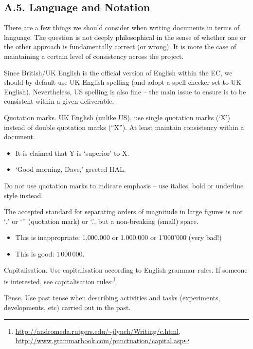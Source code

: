 \subsection*{A.5. Language and Notation}
\label{sec:appendix-a5-language-notation}

There are a few things we should consider when writing documents in terms of language. The question is not deeply philosophical in the sense of whether one or the other approach is fundamentally correct (or wrong). It is more the case of maintaining a certain level of consistency across the project.

Since British/UK English is the official version of English within the EC, we should by default use UK English spelling (and adopt a spell-checker set to UK English). Nevertheless, US spelling is also fine – the main issue to ensure is to be consistent within a given deliverable.

Quotation marks. UK English (unlike US), use single quotation marks (‘X’) instead of double quotation marks (``X''). At least maintain consistency within a document. 

\begin{itemize}
	\item It is claimed that Y is ‘superior’ to X. 
	\item ‘Good morning, Dave,’ greeted HAL.
\end{itemize}

Do not use quotation marks to indicate emphasis – use italics, bold or underline style instead.

The accepted standard for separating orders of magnitude in large figures is not ‘,’ or ‘’’ (quotation mark) or ‘.’, but a non-breaking (small) space. 

\begin{itemize}
	\item This is inappropriate: 1,000,000 or 1.000.000 or 1’000’000 (very bad!) 
	\item This is good: $1\,000\,000$. 
\end{itemize}

Capitalisation. Use capitalisation according to English grammar rules. If someone is interested, see 
capitalisation rules:\footnote{\url{http://andromeda.rutgers.edu/~jlynch/Writing/c.html}, \url{http://www.grammarbook.com/punctuation/capital.asp}}

Tense. Use past tense when describing activities and tasks (experiments, developments, etc) carried out in the past. 

